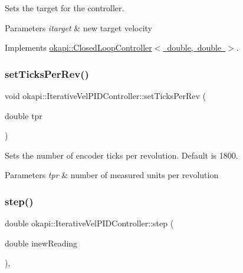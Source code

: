 Sets the target for the controller.


\begin{DoxyParams}{Parameters}
{\em itarget} & new target velocity \\
\hline
\end{DoxyParams}


Implements \mbox{\hyperlink{classokapi_1_1ClosedLoopController_ac14482d0768b3f157d52e0214a4c36d7}{okapi\+::\+Closed\+Loop\+Controller$<$ double, double $>$}}.

\mbox{\label{classokapi_1_1IterativeVelPIDController_a646a0763858e29f37fde0fb8a0fb4116}} 
\subsubsection{\texorpdfstring{setTicksPerRev()}{setTicksPerRev()}}
{\footnotesize\ttfamily void okapi\+::\+Iterative\+Vel\+P\+I\+D\+Controller\+::set\+Ticks\+Per\+Rev (\begin{DoxyParamCaption}\item[{double}]{tpr }\end{DoxyParamCaption})\hspace{0.3cm}{\ttfamily [virtual]}}

Sets the number of encoder ticks per revolution. Default is 1800.


\begin{DoxyParams}{Parameters}
{\em tpr} & number of measured units per revolution \\
\hline
\end{DoxyParams}
\mbox{\label{classokapi_1_1IterativeVelPIDController_a7d75bb1622974daba25a9dec4df68325}} 
\subsubsection{\texorpdfstring{step()}{step()}}
{\footnotesize\ttfamily double okapi\+::\+Iterative\+Vel\+P\+I\+D\+Controller\+::step (\begin{DoxyParamCaption}\item[{double}]{inew\+Reading }\end{DoxyParamCaption})\hspace{0.3cm}{\ttfamily [override]}, {\ttfamily [virtual]}}

